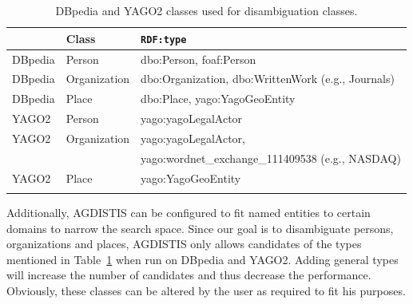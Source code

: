 \begin{table}[t!]
\centering
 \caption{DBpedia  and YAGO2 classes used for disambiguation classes.}
 \begin{tabular}{lll}
	\toprule
\textbf{} & \textbf{Class} & \texttt{\textbf{\ac{RDF}:type}}\\
\midrule
DBpedia & Person & dbo:Person, foaf:Person\\
DBpedia & Organization & dbo:Organization, dbo:WrittenWork (e.g., Journals) \\
DBpedia & Place & dbo:Place, yago:YagoGeoEntity \\
\midrule
YAGO2 & Person & yago:yagoLegalActor  \\
YAGO2 & Organization & yago:yagoLegalActor, \\
  &   &  yago:wordnet\_exchange\_111409538 (e.g., NASDAQ) \\
YAGO2 & Place & yago:YagoGeoEntity \\
\bottomrule
\label{tab:tableOfClasses}
 \end{tabular}
 \end{table}
 
 
Additionally, AGDISTIS can be configured to fit named entities to certain domains to narrow the search space.
Since our goal is to disambiguate persons, organizations and places, AGDISTIS only allows candidates of the types mentioned in Table~\ref{tab:tableOfClasses} when run on DBpedia and YAGO2.
Adding general types will increase the number of candidates and thus decrease the performance.
Obviously, these classes can be altered by the user as required to fit his purposes. 




